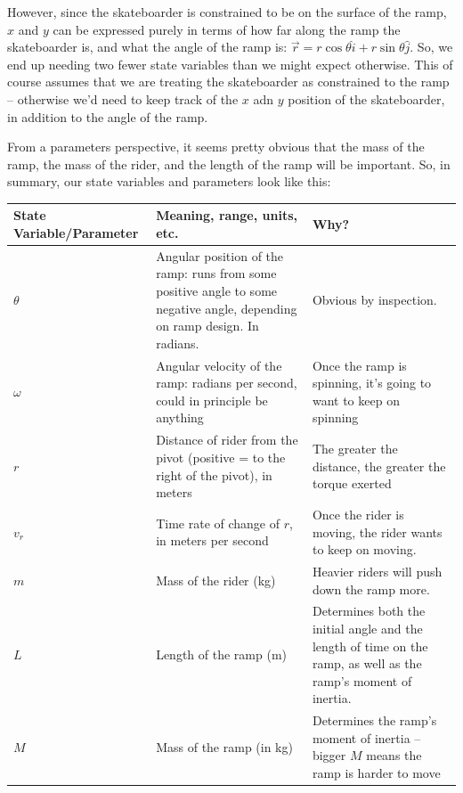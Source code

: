 However, since the skateboarder is constrained to be on the surface of the ramp, $x$ and $y$ can be expressed purely in terms of how far along the ramp the skateboarder is, and what the angle of the ramp is: $\vec{r} = r \cos \theta \hat{i} + r \sin \theta \hat{j}$.  So, we end up needing two fewer state variables than we might expect otherwise.  This of course  assumes that we are treating the skateboarder as constrained to the ramp -- otherwise we'd need to keep track of the $x$ adn $y$ position of the skateboarder, in addition to the angle of the ramp.

From a parameters perspective, it seems pretty obvious that the mass of the ramp, the mass of the rider, and the length of the ramp will be important.  So, in summary, our state variables and parameters look like this:


\begin{center}
\begin{tabular}{ p{3cm} | p{5cm} | p{5cm}}
State Variable/Parameter & Meaning, range, units, etc. & Why? \\
\hline
\hline
$\theta$ & Angular position of the ramp: runs from some positive angle to some negative angle, depending on ramp design. In radians. & Obvious by inspection. \\
\hline
$\omega$ & Angular velocity of the ramp: radians per second, could in principle be anything & Once the ramp is spinning, it's going to want to keep on spinning \\
\hline
$r$ & Distance of rider from the pivot (positive = to the right of the pivot), in meters & The greater the distance, the greater the torque exerted \\
\hline
$v_r$ & Time rate of change of $r$, in meters per second & Once the rider is moving, the rider wants to keep on moving. \\
\hline
\hline
$m$ & Mass of the rider (kg) &Heavier riders will push down the ramp more.\\
\hline
$L$ & Length of the ramp (m) & Determines both the initial angle and the length of time on the ramp, as well as the ramp's moment of inertia.\\
\hline
$M$ & Mass of the ramp (in kg) & Determines the ramp's moment of inertia -- bigger $M$ means the ramp is harder to move\\

\end{tabular}
\end{center}



